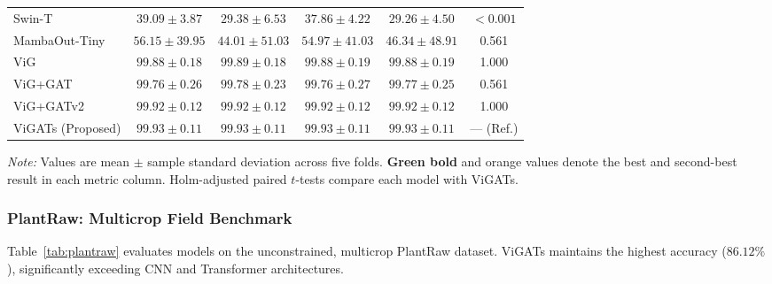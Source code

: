 \documentclass[]{interact}
\theoremstyle{plain}
\theoremstyle{definition}
\theoremstyle{remark}
\newcommand{\bestresult}[1]{\textcolor{bestgreen}{\textbf{#1}}}
\newcommand{\secondresult}[1]{\textcolor{secondorange}{#1}}
\begin{document}
{\begin{table}[H]
{\begin{tabular}{lccccc}
Swin-T \citep{liu2021swin} & $39.09 \pm 3.87$ & $29.38 \pm 6.53$ & $37.86 \pm 4.22$ & $29.26 \pm 4.50$ & $< 0.001$ \\
MambaOut-Tiny \citep{yu2024mambaout} & $56.15 \pm 39.95$ & $44.01 \pm 51.03$ & $54.97 \pm 41.03$ & $46.34 \pm 48.91$ & 0.561 \\
ViG \citep{han2022vision} & $99.88 \pm 0.18$ & $99.89 \pm 0.18$ & $99.88 \pm 0.19$ & $99.88 \pm 0.19$ & 1.000 \\
ViG+GAT \citep{velickovic2018graph} & $99.76 \pm 0.26$ & $99.78 \pm 0.23$ & $99.76 \pm 0.27$ & $99.77 \pm 0.25$ & 0.561 \\
ViG+GATv2 \citep{brody2022gat} & \secondresult{$99.92 \pm 0.12$} & \secondresult{$99.92 \pm 0.12$} & \secondresult{$99.92 \pm 0.12$} & \secondresult{$99.92 \pm 0.12$} & 1.000 \\
ViGATs (Proposed) & \bestresult{$99.93 \pm 0.11$} & \bestresult{$99.93 \pm 0.11$} & \bestresult{$99.93 \pm 0.11$} & \bestresult{$99.93 \pm 0.11$} & --- (Ref.) \\
\bottomrule
\end{tabular}}
\label{tab:three_benchmark_datasets}
\parbox{\textwidth}{\vspace{2pt}\footnotesize\textit{Note:} Values are mean $\pm$ sample standard deviation across five folds. \bestresult{Green bold} and \secondresult{orange} values denote the best and second-best result in each metric column. Holm-adjusted paired $t$-tests compare each model with ViGATs.}
\end{table}

\subsubsection{PlantRaw: Multicrop Field Benchmark}
Table~\ref{tab:plantraw} evaluates models on the unconstrained, multicrop PlantRaw dataset. ViGATs maintains the highest accuracy ($86.12\%$), significantly exceeding CNN and Transformer architectures.

}
\end{document}
